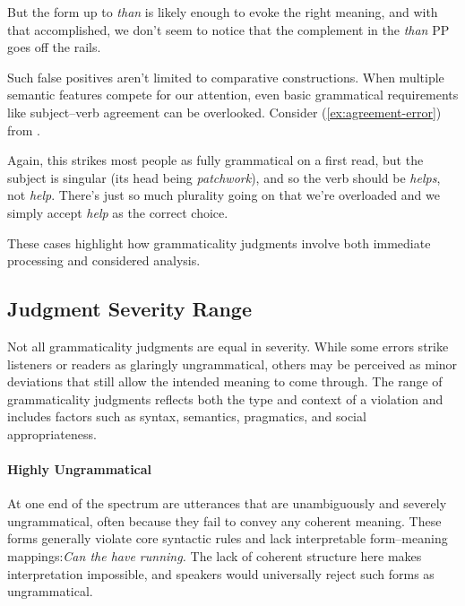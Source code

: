 But the form up to \textit{than} is likely enough to evoke the right meaning, and with that accomplished, we don't seem to notice that the complement in the \textit{than} PP goes off the rails.

Such false positives aren't limited to comparative constructions. When multiple semantic features compete for our attention, even basic grammatical requirements like subject--verb agreement can be overlooked. Consider (\ref{ex:agreement-error}) from \citet{corbett2016}.

\label{ex:agreement-error}
\z

Again, this strikes most people as fully grammatical on a first read, but the subject is singular (its head being \textit{patchwork}), and so the verb should be \textit{helps}, not \textit{help}. There's just so much plurality going on that we're overloaded and we simply accept \textit{help} as the correct choice.

These cases highlight how grammaticality judgments involve both immediate processing and considered analysis.

\subsection{Judgment Severity Range}

Not all grammaticality judgments are equal in severity. While some errors strike listeners or readers as glaringly ungrammatical, others may be perceived as minor deviations that still allow the intended meaning to come through. The range of grammaticality judgments reflects both the type and context of a violation and includes factors such as syntax, semantics, pragmatics, and social appropriateness.

\paragraph*{Highly Ungrammatical}

At one end of the spectrum are utterances that are unambiguously and severely ungrammatical, often because they fail to convey any coherent meaning. These forms generally violate core syntactic rules and lack interpretable form–meaning mappings:\textit{Can the have running.} The lack of coherent structure here makes interpretation impossible, and speakers would universally reject such forms as ungrammatical.

